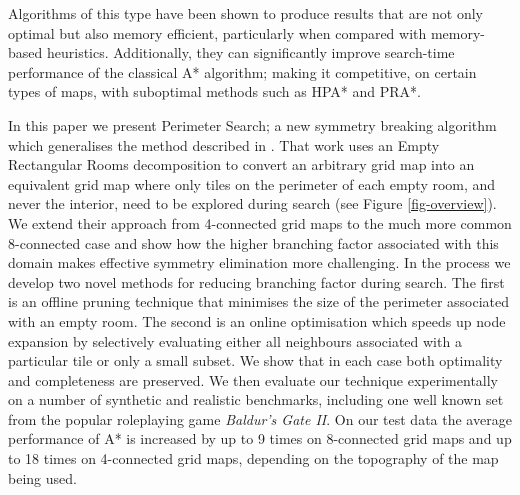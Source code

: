 Algorithms of this type have been  shown to produce results that are not only optimal but also memory efficient, 
particularly when compared with memory-based heuristics.
Additionally, they can significantly improve search-time performance of the classical A* algorithm; making it competitive,
on certain types of maps, with suboptimal methods such as HPA* and PRA*.
\par
In this paper we present Perimeter Search; a new symmetry breaking algorithm which generalises the method described in \cite{harabor10}.
That work uses an Empty Rectangular Rooms decomposition to convert an arbitrary grid map into an
equivalent grid map where only tiles on the perimeter of each empty room, and never the interior, need to be explored
during search (see Figure \ref{fig-overview}).
We extend their approach from 4-connected grid maps to the much more common 8-connected case and show how the higher branching factor associated 
with this domain makes effective symmetry elimination more challenging.
In the process we develop two novel methods for reducing branching factor during search.
The first is an offline pruning technique that minimises the size of the perimeter associated with an empty room.
The second is an online optimisation which speeds up node expansion by selectively evaluating either all neighbours
associated with a particular tile or only a small subset.
We show that in each case both optimality and completeness are preserved.
We then evaluate our technique experimentally on a number of synthetic and realistic benchmarks, including one well known set 
from the popular roleplaying game \emph{Baldur's Gate II}.
On our test data the average performance of A* is increased by up to 9 times on 8-connected grid maps and up to
18 times on 4-connected grid maps, depending on the topography of the map being used.


